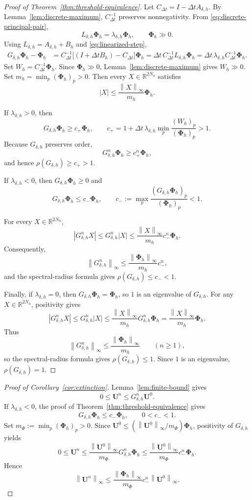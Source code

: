 \documentclass[11pt]{article}
\theoremstyle{definition}
\newcommand{\norm}[1]{\left\lVert #1\right\rVert}
\newcommand{\U}{\bm U}
\newcommand{\PhiV}{\bm\Phi}
\begin{document}
\begin{proof}[Proof of Theorem~\ref{thm:threshold-equivalence}]
Let $C_{\Delta t}=I-\Delta tA_{\delta,h}$.  By Lemma~\ref{lem:discrete-maximum}, $C_{\Delta t}^{-1}$ preserves
nonnegativity.  From \eqref{eq:discrete-principal-pair},
\[
 L_{\delta,h}\PhiV_h=\lambda_{\delta,h}\PhiV_h,
 \qquad \PhiV_h\gg0.
\]
Using $L_{\delta,h}=A_{\delta,h}+B_h$ and
\eqref{eq:linearized-step},
\begin{align*}
 G_{\delta,h}\PhiV_h-\PhiV_h
 &=C_{\Delta t}^{-1}
   \big[(I+\Delta tB_h)-C_{\Delta t}\big]\PhiV_h =\Delta t\,C_{\Delta t}^{-1}L_{\delta,h}\PhiV_h =\Delta t\,\lambda_{\delta,h}
   C_{\Delta t}^{-1}\PhiV_h.
\end{align*}
Set $W_h=C_{\Delta t}^{-1}\PhiV_h$.  Since $\PhiV_h\gg0$,
Lemma~\ref{lem:discrete-maximum} gives $W_h\gg0$.  Set
$m_h=\min_p(\PhiV_h)_p>0$.  Then every $X\in\mathbb R^{2N_h}$ satisfies
\[
 |X|\le \frac{\norm{X}_\infty}{m_h}\PhiV_h.
\]

If $\lambda_{\delta,h}>0$, then
\[
 G_{\delta,h}\PhiV_h
 \ge c_+\PhiV_h,
 \qquad
 c_+
 =1+\Delta t\,\lambda_{\delta,h}
   \min_p\frac{(W_h)_p}{(\PhiV_h)_p}>1.
\]
Because $G_{\delta,h}$ preserves order,
\[
 G_{\delta,h}^n\PhiV_h\ge c_+^n\PhiV_h,
\]
and hence $\rho(G_{\delta,h})\ge c_+>1$.

If $\lambda_{\delta,h}<0$, then $G_{\delta,h}\PhiV_h\ge0$ and
\[
 G_{\delta,h}\PhiV_h
 \le c_-\PhiV_h,
 \qquad
 c_-:=\max_p
 \frac{(G_{\delta,h}\PhiV_h)_p}{(\PhiV_h)_p}<1.
\]

For every $X\in\mathbb R^{2N_h}$,
\[
 |G_{\delta,h}^nX|
 \le G_{\delta,h}^n|X|
 \le
 \frac{\norm{X}_\infty}{m_h}c_-^n\PhiV_h.
\]
Consequently,
\[
 \norm{G_{\delta,h}^n}_\infty
 \le
 \frac{\norm{\PhiV_h}_\infty}{m_h}c_-^n,
\]
and the spectral-radius formula gives $\rho(G_{\delta,h})\le c_-<1$.


Finally, if $\lambda_{\delta,h}=0$, then
$G_{\delta,h}\PhiV_h=\PhiV_h$, so $1$ is an eigenvalue of
$G_{\delta,h}$. For any $X\in\mathbb R^{2N_h}$, positivity gives
\[
 |G_{\delta,h}^nX|
 \le
 G_{\delta,h}^n|X|
 \le
 \frac{\norm{X}_\infty}{m_h}G_{\delta,h}^n\PhiV_h
 =
 \frac{\norm{X}_\infty}{m_h}\PhiV_h.
\]
Thus
\[
 \norm{G_{\delta,h}^n}_\infty
 \le
 \frac{\norm{\PhiV_h}_\infty}{m_h}
 \qquad(n\ge1),
\]
so the spectral-radius formula gives $\rho(G_{\delta,h})\le1$.
Since $1$ is an eigenvalue, $\rho(G_{\delta,h})=1$.
\end{proof}

\begin{proof}[Proof of Corollary~\ref{cor:extinction}]
Lemma~\ref{lem:finite-bound} gives
\[
 0\le\U^n\le G_{\delta,h}^n\U^0.
\]
If $\lambda_{\delta,h}<0$, the proof of
Theorem~\ref{thm:threshold-equivalence} gives
\[
 G_{\delta,h}\PhiV_h\le c_-\PhiV_h,
 \qquad 0<c_-<1.
\]
Set $m_\Phi:=\min_p(\PhiV_h)_p>0$.  Since $\U^0\le(\norm{\U^0}_\infty/m_\Phi)\PhiV_h$, positivity of $G_{\delta,h}$ yields
\[
 0\le\U^n
 \le
 \frac{\norm{\U^0}_\infty}{m_\Phi}
 G_{\delta,h}^n\PhiV_h
 \le
 \frac{\norm{\U^0}_\infty}{m_\Phi}
 c_-^n\PhiV_h.
\]
Hence
\[
 \norm{\U^n}_\infty
 \le
 \frac{\norm{\PhiV_h}_\infty}{m_\Phi}
 c_-^n\norm{\U^0}_\infty.
\]
\end{proof}
\end{document}
